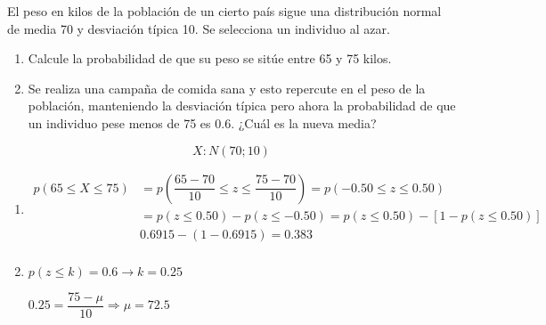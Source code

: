 \begin{exercise}
  El peso en kilos de la población de un cierto país sigue una distribución normal de media 70 y desviación típica 10. Se selecciona un individuo al azar. 
  \begin{enumerate}[label=\alph* )]
  \item Calcule la probabilidad de que su peso se sitúe entre 65 y 75 kilos.
  \item Se realiza una campaña de comida sana y esto repercute en el peso de la población, manteniendo la desviación típica pero ahora la probabilidad de que un individuo pese menos de 75 es 0.6. ¿Cuál es la nueva media?
  \end{enumerate}

  \tcblower

  \[ X:N(70;10) \]
  \begin{enumerate}[label=\alph* )]
  \item
  \begin{align*}
  p(65 \leq X \leq 75) & = p \left( \dfrac{65-70}{10} \leq z \leq \dfrac{75-70}{10} \right) = p (-0.50 \leq z \leq 0.50) \\
  & = p(z \leq 0.50)-p(z \leq -0.50)=p(z \leq 0.50)-[1-p(z \leq 0.50)] \\
  & 0.6915-(1-0.6915) = 0.383 \\
  \end{align*}
  \item

  $p(z \leq k )=0.6 \rightarrow k = 0.25$

  $0.25 = \dfrac{75-\mu}{10} \Rightarrow \mu = 72.5$
  \end{enumerate}
\end{exercise}

